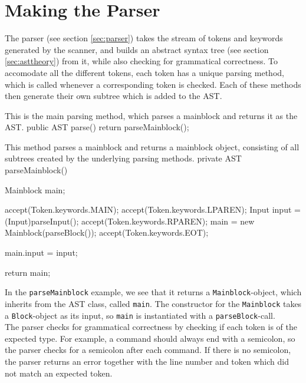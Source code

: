 \section{Making the Parser}
The parser (see section \ref{sec:parser}) takes the stream of tokens and keywords generated by the scanner, and builds an abstract syntax tree (see section \ref{sec:asttheory}) from it, while also checking for grammatical correctness.
To accomodate all the different tokens, each token has a unique parsing method, which is called whenever a corresponding token is checked.
Each of these methods then generate their own subtree which is added to the AST. \\

\begin{source}{This is the main parsing method, which parses a mainblock and returns it as the AST.}{}
public AST parse()
        {
            return parseMainblock();
        }
\end{source}
\begin{source}{This method parses a mainblock and returns a mainblock object, consisting of all subtrees created by the underlying parsing methods.}{}
private AST parseMainblock()
        {
            Mainblock main;

            accept(Token.keywords.MAIN);
            accept(Token.keywords.LPAREN);
            Input input = (Input)parseInput();
            accept(Token.keywords.RPAREN);
            main = new Mainblock(parseBlock());
            accept(Token.keywords.EOT);

            main.input = input;

            return main;
        }
\end{source}
In the \texttt{parseMainblock} example, we see that it returns a \texttt{Mainblock}-object, which inherits from the AST class, called \texttt{main}. 
The constructor for the \texttt{Mainblock} takes a \texttt{Block}-object as its input, so \texttt{main} is instantiated with a \texttt{parseBlock}-call. \\
The parser checks for grammatical correctness by checking if each token is of the expected type. 
For example, a command should always end with a semicolon, so the parser checks for a semicolon after each command. 
If there is no semicolon, the parser returns an error together with the line number and token which did not match an expected token.